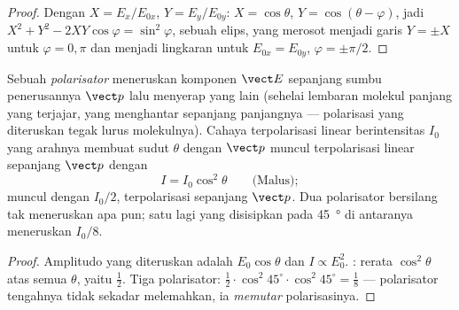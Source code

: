 \begin{proof}
Dengan $X = E_x/E_{0x}$, $Y = E_y/E_{0y}$: $X = \cos\theta$, $Y = \cos(\theta - \varphi)$, jadi
$X^2 + Y^2 - 2XY\cos\varphi = \sin^2\varphi$, sebuah elips, yang merosot menjadi
garis $Y = \pm X$ untuk $\varphi = 0, \pi$ dan menjadi lingkaran untuk $E_{0x} = E_{0y}$,
$\varphi = \pm\pi/2$.
\end{proof}

\begin{proposition}\label{prop:b2:plane-waves-polarization:malus}
Sebuah \emph{polarisator} meneruskan komponen $\vect E$ sepanjang sumbu
penerusannya $\vect p$ lalu menyerap yang lain (sehelai lembaran molekul
panjang yang terjajar, yang menghantar sepanjang panjangnya --- polarisasi
yang diteruskan tegak lurus molekulnya). Cahaya terpolarisasi linear
berintensitas $I_0$ yang arahnya membuat sudut $\theta$ dengan
$\vect p$ muncul terpolarisasi linear sepanjang $\vect p$ dengan
\[
I = I_0\cos^2\theta \qquad\text{(Malus)} ;
\]
 muncul dengan $I_0/2$, terpolarisasi sepanjang $\vect p$. Dua
polarisator bersilang tak meneruskan apa pun; satu lagi yang disisipkan pada
\qty{45}{\degree} di antaranya meneruskan $I_0/8$.
\end{proposition}

\begin{proof}
Amplitudo yang diteruskan adalah $E_0\cos\theta$ dan $I \propto E_0^2$. : rerata $\cos^2\theta$ atas semua $\theta$, yaitu $\tfrac12$. Tiga polarisator:
$\tfrac12\cdot\cos^2 45^\circ\cdot\cos^2 45^\circ = \tfrac18$ --- polarisator
tengahnya tidak sekadar melemahkan, ia \emph{memutar} polarisasinya.
\end{proof}

